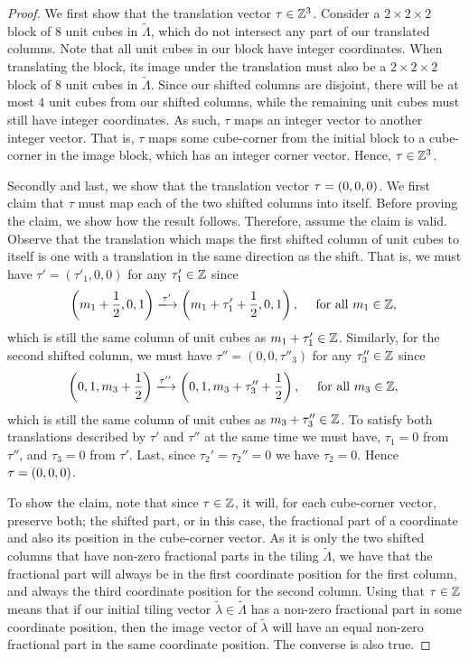 \documentclass[../thesis.tex]{subfiles}
\begin{document}
\begin{proof}
We first show that the translation vector $\tau \in \mathbb{Z}^3$. Consider a $2\times 2\times 2$ block of $8$ unit cubes in $\widetilde{\Lambda}$, which do not intersect any part of our translated columns. Note that all unit cubes in our block have integer coordinates. When translating the block, its image under the translation must also be a $2\times 2\times 2$ block of $8$ unit cubes in $\widetilde{\Lambda}$. Since our shifted columns are disjoint, there will be at most $4$ unit cubes from our shifted columns, while the remaining unit cubes must still have integer coordinates. As such, $\tau$ maps an integer vector to another integer vector. That is, $\tau$ maps some cube-corner from the initial block to a cube-corner in the image block, which has an integer corner vector. Hence, $\tau \in \mathbb{Z}^3$. 

Secondly and last, we show that the translation vector $\tau = (0,0,0)$. We first claim that $\tau$ must map each of the two shifted columns into itself. Before proving the claim, we show how the result follows. Therefore, assume the claim is valid. Observe that the translation which maps the first shifted column of unit cubes to itself is one with a translation in the same direction as the shift. That is, we must have $\tau' = (\tau'_1,0,0)$ for any $\tau'_1\in \mathbb{Z}$ since
\begin{equation*}
    \bracMed{m_1 + \frac{1}{2} ,0,1} \xlongrightarrow[]{\tau'} \bracMed{m_1+\tau'_1 + \frac{1}{2} ,0,1}, \quad \text{ for all } m_1 \in \Z,\\
\end{equation*}
which is still the same column of unit cubes as $m_1+\tau'_1\in\mathbb{Z}$. Similarly, for the second shifted column, we must have $\tau'' = (0,0,\tau''_3)$ for any $\tau''_3\in \mathbb{Z}$ since 
\begin{equation*}
    \bracMed{0,1,m_3 + \frac{1}{2} } \xlongrightarrow[]{\tau''} \bracMed{0,1,m_3+\tau''_3 + \frac{1}{2} } , \quad \text{ for all } m_3 \in \Z,\\
\end{equation*}
which is still the same column of unit cubes as $m_3+\tau''_3\in\mathbb{Z}$. To satisfy both translations described by $\tau'$ and $\tau''$ at the same time we must have, $\tau_1 = 0$ from $\tau''$, and $\tau_3 = 0$ from $\tau'$. Last, since $\tau_2'=\tau_2'' = 0$ we have $\tau_2=0$. Hence $\tau = (0,0,0)$.

To show the claim, note that since $\tau\in\mathbb{Z}$, it will, for each cube-corner vector, preserve both; the shifted part, or in this case, the fractional part of a coordinate and also its position in the cube-corner vector. As it is only the two shifted columns that have non-zero fractional parts in the tiling $\widetilde{\Lambda}$, we have that the fractional part will always be in the first coordinate position for the first column, and always the third coordinate position for the second column. Using that $\tau\in\mathbb{Z}$ means that if our initial tiling vector $\tilde{\lambda} \in \widetilde{\Lambda}$ has a non-zero fractional part in some coordinate position, then the image vector of $\tilde{\lambda}$ will have an equal non-zero fractional part in the same coordinate position. The converse is also true. 


\end{proof}
\end{document}
